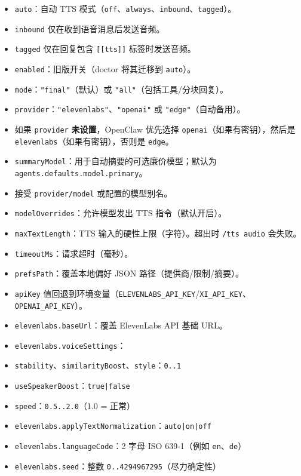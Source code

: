 \begin{itemize}
  \item \texttt{auto}：自动 TTS 模式（\texttt{off}、\texttt{always}、\texttt{inbound}、\texttt{tagged}）。
  \item \texttt{inbound} 仅在收到语音消息后发送音频。
  \item \texttt{tagged} 仅在回复包含 \texttt{[[tts]]} 标签时发送音频。
  \item \texttt{enabled}：旧版开关（doctor 将其迁移到 \texttt{auto}）。
  \item \texttt{mode}：\texttt{"final"}（默认）或 \texttt{"all"}（包括工具/分块回复）。
  \item \texttt{provider}：\texttt{"elevenlabs"}、\texttt{"openai"} 或 \texttt{"edge"}（自动备用）。
  \item 如果 \texttt{provider} \textbf{未设置}，OpenClaw 优先选择 \texttt{openai}（如果有密钥），然后是 \texttt{elevenlabs}（如果有密钥），否则是 \texttt{edge}。
  \item \texttt{summaryModel}：用于自动摘要的可选廉价模型；默认为 \texttt{agents.defaults.model.primary}。
  \item 接受 \texttt{provider/model} 或配置的模型别名。
  \item \texttt{modelOverrides}：允许模型发出 TTS 指令（默认开启）。
  \item \texttt{maxTextLength}：TTS 输入的硬性上限（字符）。超出时 \texttt{/tts audio} 会失败。
  \item \texttt{timeoutMs}：请求超时（毫秒）。
  \item \texttt{prefsPath}：覆盖本地偏好 JSON 路径（提供商/限制/摘要）。
  \item \texttt{apiKey} 值回退到环境变量（\texttt{ELEVENLABS\_API\_KEY}/\texttt{XI\_API\_KEY}、\texttt{OPENAI\_API\_KEY}）。
  \item \texttt{elevenlabs.baseUrl}：覆盖 ElevenLabs API 基础 URL。
  \item \texttt{elevenlabs.voiceSettings}：
  \item \texttt{stability}、\texttt{similarityBoost}、\texttt{style}：\texttt{0..1}
  \item \texttt{useSpeakerBoost}：\texttt{true|false}
  \item \texttt{speed}：\texttt{0.5..2.0}（1.0 = 正常）
  \item \texttt{elevenlabs.applyTextNormalization}：\texttt{auto|on|off}
  \item \texttt{elevenlabs.languageCode}：2 字母 ISO 639-1（例如 \texttt{en}、\texttt{de}）
  \item \texttt{elevenlabs.seed}：整数 \texttt{0..4294967295}（尽力确定性）

\end{itemize}
